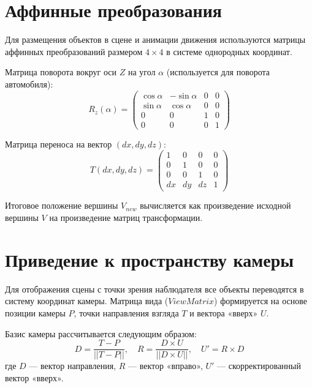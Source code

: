 \section{Аффинные преобразования}

Для размещения объектов в сцене и анимации движения используются матрицы аффинных преобразований размером $4 \times 4$ в системе однородных координат.

Матрица поворота вокруг оси $Z$ на угол $\alpha$ (используется для поворота автомобиля):
\begin{equation}
	R_z(\alpha) = \begin{pmatrix}
		\cos \alpha & -\sin \alpha & 0 & 0 \\
		\sin \alpha & \cos \alpha & 0 & 0 \\
		0 & 0 & 1 & 0 \\
		0 & 0 & 0 & 1
	\end{pmatrix}
\end{equation}

Матрица переноса на вектор $(dx, dy, dz)$:
\begin{equation}
	T(dx, dy, dz) = \begin{pmatrix}
		1 & 0 & 0 & 0 \\
		0 & 1 & 0 & 0 \\
		0 & 0 & 1 & 0 \\
		dx & dy & dz & 1
	\end{pmatrix}
\end{equation}

Итоговое положение вершины $V_{new}$ вычисляется как произведение исходной вершины $V$ на произведение матриц трансформации.

\section{Приведение к пространству камеры}

Для отображения сцены с точки зрения наблюдателя все объекты переводятся в систему координат камеры. Матрица вида ($View Matrix$) формируется на основе позиции камеры $P$, точки направления взгляда $T$ и вектора «вверх» $U$.

Базис камеры рассчитывается следующим образом:
\begin{equation}
	D = \frac{T - P}{||T - P||}, \quad R = \frac{D \times U}{||D \times U||}, \quad U' = R \times D
\end{equation}
где $D$ — вектор направления, $R$ — вектор «вправо», $U'$ — скорректированный вектор «вверх».

